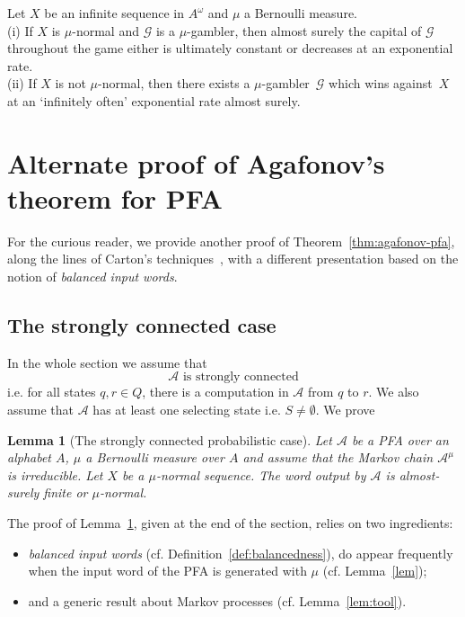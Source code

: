 \documentclass[11pt]{article}
\newtheorem{lemma}{Lemma}
\newcommand{\A}{\mathcal{A}}
\newcommand{\G}{\mathcal{G}}
\begin{document}
\begin{theorem}
\label{thm:probabilisticdichotomy}
Let $X$ be an infinite sequence in $A^\omega$ and $\mu$ a Bernoulli measure. \\
(i) If $X$ is $\mu$-normal and $\G$ is a $\mu$-gambler, then almost surely the capital of $\G$ throughout the game either is ultimately constant or decreases at an exponential rate.\\
(ii) If $X$ is not $\mu$-normal, then there exists a $\mu$-gambler~$\G$ which wins against~$X$ at an `infinitely often' exponential rate almost surely.
\end{theorem}


\section{Alternate proof of Agafonov's theorem for PFA}
\label{sec:agafonovalternateproof}

For the curious reader,
we provide another proof of Theorem~\ref{thm:agafonov-pfa},
along the lines of Carton's techniques~\cite{Carton2020},
with a different presentation based on the notion of \emph{balanced input words}.

\subsection{The strongly connected case}

In the whole section we assume that 
\[
\text{$\A$ is strongly connected}
\]
i.e. for all states $q,r \in Q$,
there is a computation in $\A$ from $q$ to $r$.
We also assume that $\A$ has at least one selecting state i.e. $S \neq \emptyset$.
We prove
\begin{lemma}[The strongly connected probabilistic case]
\label{lem:scpc}
Let $\A$ be a PFA over an alphabet $A$, 
$\mu$ a Bernoulli measure over $A$ 
and assume that the Markov chain $\A^\mu$ is irreducible. 
Let $X$ be a $\mu$-normal sequence.
The word output by $\A$ is almost-surely finite or $\mu$-normal.
\end{lemma}

The proof of Lemma~\ref{lem:scpc}, given at the end of the section,
relies on two ingredients:
\begin{itemize}
\item
\emph{balanced input words} (cf. Definition~\ref{def:balancedness}),
do appear frequently 
when the input word of the PFA is generated with $\mu$
(cf. Lemma~\ref{lem});
\item
and a generic result about Markov processes
(cf. Lemma~\ref{lem:tool}).
\end{itemize}
\end{document}
